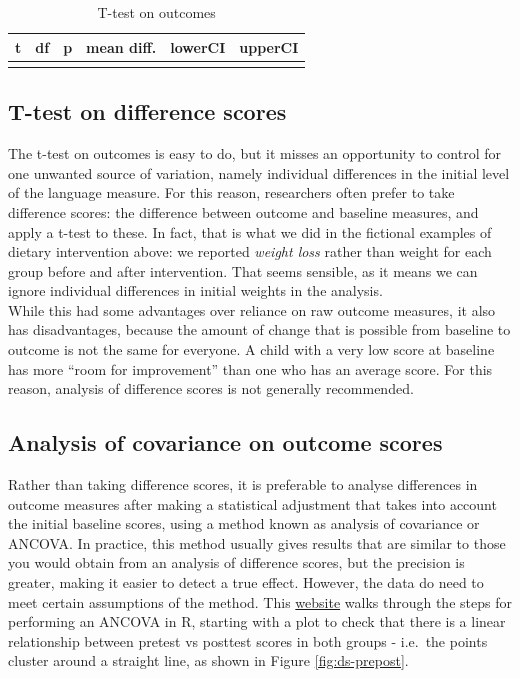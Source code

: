 \documentclass{krantz}
\begin{document}
\begin{table}

\caption{\label{tab:ttestoutcomes}T-test on outcomes}
\centering
\begin{tabular}[t]{cccccc}
\toprule
t & df & p & mean diff. & lowerCI & upperCI\\
\midrule
\cellcolor{gray!6}{2.602} & \cellcolor{gray!6}{52} & \cellcolor{gray!6}{0.006} & \cellcolor{gray!6}{5.94} & \cellcolor{gray!6}{2.117} & \cellcolor{gray!6}{Inf}\\
\bottomrule
\end{tabular}
\end{table}

\hypertarget{t-test-on-difference-scores}{%
\subsection{T-test on difference scores}\label{t-test-on-difference-scores}}

The t-test on outcomes is easy to do, but it misses an opportunity to control for one unwanted source of variation, namely individual differences in the initial level of the language measure. For this reason, researchers often prefer to take difference scores: the difference between outcome and baseline measures, and apply a t-test to these. In fact, that is what we did in the fictional examples of dietary intervention above: we reported \emph{weight loss} rather than weight for each group before and after intervention. That seems sensible, as it means we can ignore individual differences in initial weights in the analysis.\\
While this had some advantages over reliance on raw outcome measures, it also has disadvantages, because the amount of change that is possible from baseline to outcome is not the same for everyone. A child with a very low score at baseline has more ``room for improvement'' than one who has an average score. For this reason, analysis of difference scores is not generally recommended.

\hypertarget{analysis-of-covariance-on-outcome-scores}{%
\subsection{Analysis of covariance on outcome scores}\label{analysis-of-covariance-on-outcome-scores}}

Rather than taking difference scores, it is preferable to analyse differences in outcome measures after making a statistical adjustment that takes into account the initial baseline scores, using a method known as analysis of covariance or ANCOVA. In practice, this method usually gives results that are similar to those you would obtain from an analysis of difference scores, but the precision is greater, making it easier to detect a true effect. However, the data do need to meet certain assumptions of the method. This \href{https://www.datanovia.com/en/lessons/ancova-in-r/}{website} walks through the steps for performing an ANCOVA in R, starting with a plot to check that there is a linear relationship between pretest vs posttest scores in both groups - i.e.~the points cluster around a straight line, as shown in Figure \ref{fig:ds-prepost}.
\end{document}
